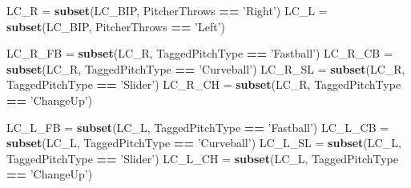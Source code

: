 \documentclass[]{article}
\newenvironment{Shaded}{\begin{snugshade}}{\end{snugshade}}
\newcommand{\KeywordTok}[1]{\textcolor[rgb]{0.13,0.29,0.53}{\textbf{#1}}}
\newcommand{\StringTok}[1]{\textcolor[rgb]{0.31,0.60,0.02}{#1}}
\newcommand{\OperatorTok}[1]{\textcolor[rgb]{0.81,0.36,0.00}{\textbf{#1}}}
\newcommand{\NormalTok}[1]{#1}
\begin{document}
\begin{Shaded}
\begin{Highlighting}[]
\NormalTok{LC_R =}\StringTok{ }\KeywordTok{subset}\NormalTok{(LC_BIP, PitcherThrows }\OperatorTok{==}\StringTok{ 'Right'}\NormalTok{)}
\NormalTok{LC_L =}\StringTok{ }\KeywordTok{subset}\NormalTok{(LC_BIP, PitcherThrows }\OperatorTok{==}\StringTok{ 'Left'}\NormalTok{)}

\NormalTok{LC_R_FB =}\StringTok{ }\KeywordTok{subset}\NormalTok{(LC_R, TaggedPitchType }\OperatorTok{==}\StringTok{ 'Fastball'}\NormalTok{)}
\NormalTok{LC_R_CB =}\StringTok{ }\KeywordTok{subset}\NormalTok{(LC_R, TaggedPitchType }\OperatorTok{==}\StringTok{ 'Curveball'}\NormalTok{)}
\NormalTok{LC_R_SL =}\StringTok{ }\KeywordTok{subset}\NormalTok{(LC_R, TaggedPitchType }\OperatorTok{==}\StringTok{ 'Slider'}\NormalTok{)}
\NormalTok{LC_R_CH =}\StringTok{ }\KeywordTok{subset}\NormalTok{(LC_R, TaggedPitchType }\OperatorTok{==}\StringTok{ 'ChangeUp'}\NormalTok{)}

\NormalTok{LC_L_FB =}\StringTok{ }\KeywordTok{subset}\NormalTok{(LC_L, TaggedPitchType }\OperatorTok{==}\StringTok{ 'Fastball'}\NormalTok{)}
\NormalTok{LC_L_CB =}\StringTok{ }\KeywordTok{subset}\NormalTok{(LC_L, TaggedPitchType }\OperatorTok{==}\StringTok{ 'Curveball'}\NormalTok{)}
\NormalTok{LC_L_SL =}\StringTok{ }\KeywordTok{subset}\NormalTok{(LC_L, TaggedPitchType }\OperatorTok{==}\StringTok{ 'Slider'}\NormalTok{)}
\NormalTok{LC_L_CH =}\StringTok{ }\KeywordTok{subset}\NormalTok{(LC_L, TaggedPitchType }\OperatorTok{==}\StringTok{ 'ChangeUp'}\NormalTok{)}


\end{Highlighting}
\end{Shaded}
\end{document}
